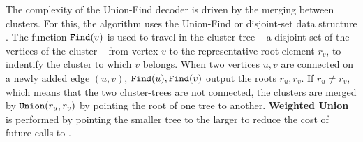 The complexity of the Union-Find decoder is driven by the merging between clusters. For this, the algorithm uses the Union-Find or disjoint-set data structure \cite{tarjan1975efficiency}. The function $\texttt{Find}(v)$ is used to travel in the cluster-tree -- a disjoint set of the vertices of the cluster -- from vertex $v$ to the representative root element $r_v$, to indentify the cluster to which $v$ belongs. When two vertices $u, v$ are connected on a newly added edge $(u,v)$, $\texttt{Find}(u), \texttt{Find}(v)$ output the roots $r_u, r_v$. If $r_u \neq r_v$, which means that the two cluster-trees are not connected, the clusters are merged by $\texttt{Union}(r_u, r_v)$ by pointing the root of one tree to another. \textbf{Weighted Union} is performed by pointing the smaller tree to the larger to reduce the cost of future calls to .